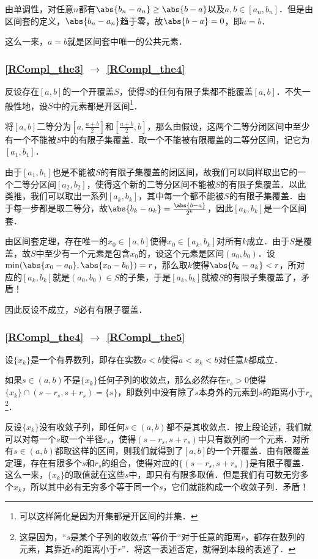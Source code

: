 由单调性，对任意$n$都有$\abs{b_n-a_n}\geq\abs{b-a}$以及$a, b\in [a_n, b_n]$．但是由区间套的定义，$\abs{b_n-a_n}$趋于零，故$\abs{b-a}=0$，即$a=b$．

这么一来，$a=b$就是区间套中唯一的公共元素．

\subsubsection{\autoref{RCompl_the3} $\to$ \autoref{RCompl_the4} }

反设存在$[a, b]$的一个开覆盖$S$，使得$S$的任何有限子集都不能覆盖$[a, b]$．不失一般性地，设$S$中的元素都是开区间\footnote{可以这样简化是因为开集都是开区间的并集．}．

将$[a, b]$二等分为$[a, \frac{a+b}{2}]$和$[\frac{a+b}{2}, b]$，那么由假设，这两个二等分闭区间中至少有一个不能被$S$中的有限子集覆盖．取一个不能被有限覆盖的二等分区间，记它为$[a_1, b_1]$．

由于$[a_1, b_1]$也是不能被$S$的有限子集覆盖的闭区间，故我们可以同样取出它的一个二等分区间$[a_2, b_2]$，使得这个新的二等分区间不能被$S$的有限子集覆盖．以此类推，我们可以取出一系列$[a_k, b_k]$，其中每一个都不能被$S$的有限子集覆盖．由于每一步都是取二等分，故$\abs{b_k-a_k}=\frac{\abs{b-a}}{2^k}$，因此$[a_k, b_k]$是一个区间套．

由区间套定理，存在唯一的$x_0\in[a, b]$使得$x_0\in[a_k, b_k]$对所有$k$成立．由于$S$是覆盖，故$S$中至少有一个元素是包含$x_0$的，设这个元素是区间$(a_0, b_0)$．设$\min(\abs{x_0-a_0}, \abs{x_0-b_0})=r$，那么取$k$使得$\abs{b_k-a_k}<r$，所对应的$[a_k, b_k]$就是$(a_0, b_0)\in S$的子集，于是$[a_k, b_k]$就被$S$的有限子集覆盖了，矛盾！

因此反设不成立，$S$必有有限子覆盖．

\subsubsection{\autoref{RCompl_the4} $\to$ \autoref{RCompl_the5} }

设$\{x_k\}$是一个有界数列，即存在实数$a<b$使得$a<x_k<b$对任意$k$都成立．

如果$s\in(a, b)$不是$\{x_k\}$任何子列的收敛点，那么必然存在$r_s>0$使得$\{x_k\}\cap (s-r_s, s+r_s)=\{s\}$，即数列中没有除了$s$本身外的元素到$s$的距离小于$r_s$\footnote{这是因为，“$s$是某个子列的收敛点”等价于“对于任意的距离$r$，都存在数列的元素，其靠近$s$的距离小于$r$”．将这一表述否定，就得到本段的表述了．}．

反设$\{x_k\}$没有收敛子列，即任何$s\in(a, b)$都不是其收敛点．按上段论述，我们就可以对每一个$s$取一个半径$r_s$，使得$(s-r_s, s+r_s)$中只有数列的一个元素．对所有$s\in(a, b)$都取这样的区间，则我们就得到了$[a, b]$的一个开覆盖．由有限覆盖定理，存在有限多个$s$和$r_s$的组合，使得对应的$\{(s-r_s, s+r_s)\}$是有限子覆盖．这么一来，$\{x_k\}$的取值就在这些$s$中，即只有有限多取值．但是我们有可数无穷多个$x_k$，所以其中必有无穷多个等于同一个$s$，它们就能构成一个收敛子列．矛盾！

